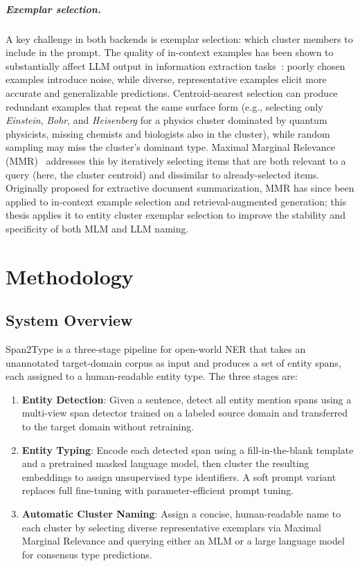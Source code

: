 \documentclass[14pt]{extreport}
\newcommand{\nochapterspacing}[1]{%
  \cleardoublepage %
  \titlespacing*{\chapter}{0pt}{0pt}{5pt}%
  \chapter{#1}%
  \label{ch:#1}%
  \titlespacing*{\chapter}{0pt}{0pt}{5pt}%
}
\begin{document}
\paragraph{Exemplar selection.}
A key challenge in both backends is exemplar selection: which cluster members to include in the prompt. The quality of in-context examples has been shown to substantially affect LLM output in information extraction tasks~\cite{brown-etal-2020-language}: poorly chosen examples introduce noise, while diverse, representative examples elicit more accurate and generalizable predictions. Centroid-nearest selection can produce redundant examples that repeat the same surface form (e.g., selecting only \textit{Einstein}, \textit{Bohr}, and \textit{Heisenberg} for a physics cluster dominated by quantum physicists, missing chemists and biologists also in the cluster), while random sampling may miss the cluster’s dominant type. Maximal Marginal Relevance (MMR)~\cite{carbonell-goldstein-1998-use} addresses this by iteratively selecting items that are both relevant to a query (here, the cluster centroid) and dissimilar to already-selected items. Originally proposed for extractive document summarization, MMR has since been applied to in-context example selection and retrieval-augmented generation; this thesis applies it to entity cluster exemplar selection to improve the stability and specificity of both MLM and LLM naming.



\nochapterspacing{Methodology}\label{sec:Method}

\section{System Overview}

Span2Type is a three-stage pipeline for open-world NER that takes an unannotated target-domain corpus as input and produces a set of entity spans, each assigned to a human-readable entity type. The three stages are:

\begin{enumerate}
    \item \textbf{Entity Detection}: Given a sentence, detect all entity mention spans using a multi-view span detector trained on a labeled source domain and transferred to the target domain without retraining.
    \item \textbf{Entity Typing}: Encode each detected span using a fill-in-the-blank template and a pretrained masked language model, then cluster the resulting embeddings to assign unsupervised type identifiers. A soft prompt variant replaces full fine-tuning with parameter-efficient prompt tuning.
    \item \textbf{Automatic Cluster Naming}: Assign a concise, human-readable name to each cluster by selecting diverse representative exemplars via Maximal Marginal Relevance and querying either an MLM or a large language model for consensus type predictions.
\end{enumerate}
\end{document}
